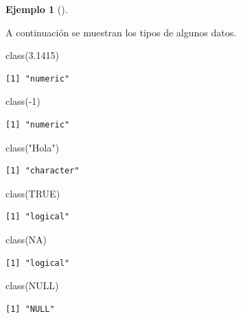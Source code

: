 \documentclass[
  a4paper,
]{scrreport}
\newenvironment{Shaded}{\begin{snugshade}}{\end{snugshade}}
\newcommand{\ConstantTok}[1]{\textcolor[rgb]{0.56,0.35,0.01}{#1}}
\newcommand{\DecValTok}[1]{\textcolor[rgb]{0.68,0.00,0.00}{#1}}
\newcommand{\FloatTok}[1]{\textcolor[rgb]{0.68,0.00,0.00}{#1}}
\newcommand{\FunctionTok}[1]{\textcolor[rgb]{0.28,0.35,0.67}{#1}}
\newcommand{\NormalTok}[1]{\textcolor[rgb]{0.00,0.23,0.31}{#1}}
\newcommand{\SpecialCharTok}[1]{\textcolor[rgb]{0.37,0.37,0.37}{#1}}
\newcommand{\StringTok}[1]{\textcolor[rgb]{0.13,0.47,0.30}{#1}}
\theoremstyle{definition}
\newtheorem{example}{Ejemplo}[chapter]
\theoremstyle{definition}
\theoremstyle{remark}
\begin{document}
\leavevmode{}%
\begin{example}[]\label{exm-tipos-datos}

A continuación se muestran los tipos de algunos datos.

\begin{Shaded}
\begin{Highlighting}[]
\FunctionTok{class}\NormalTok{(}\FloatTok{3.1415}\NormalTok{)}
\end{Highlighting}
\end{Shaded}

\begin{verbatim}
[1] "numeric"
\end{verbatim}

\begin{Shaded}
\begin{Highlighting}[]
\FunctionTok{class}\NormalTok{(}\SpecialCharTok{{-}}\DecValTok{1}\NormalTok{)}
\end{Highlighting}
\end{Shaded}

\begin{verbatim}
[1] "numeric"
\end{verbatim}

\begin{Shaded}
\begin{Highlighting}[]
\FunctionTok{class}\NormalTok{(}\StringTok{"Hola"}\NormalTok{)}
\end{Highlighting}
\end{Shaded}

\begin{verbatim}
[1] "character"
\end{verbatim}

\begin{Shaded}
\begin{Highlighting}[]
\FunctionTok{class}\NormalTok{(}\ConstantTok{TRUE}\NormalTok{)}
\end{Highlighting}
\end{Shaded}

\begin{verbatim}
[1] "logical"
\end{verbatim}

\begin{Shaded}
\begin{Highlighting}[]
\FunctionTok{class}\NormalTok{(}\ConstantTok{NA}\NormalTok{)}
\end{Highlighting}
\end{Shaded}

\begin{verbatim}
[1] "logical"
\end{verbatim}

\begin{Shaded}
\begin{Highlighting}[]
\FunctionTok{class}\NormalTok{(}\ConstantTok{NULL}\NormalTok{)}
\end{Highlighting}
\end{Shaded}

\begin{verbatim}
[1] "NULL"
\end{verbatim}

\end{example}
\end{document}
